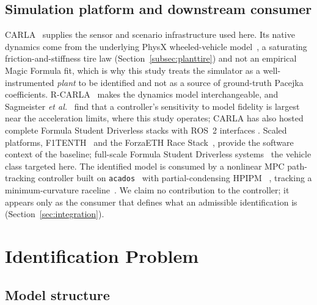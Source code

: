 \documentclass[lineno,12pt]{sn-jnl}
\theoremstyle{thmstyleone}%
\theoremstyle{thmstyletwo}%
\theoremstyle{thmstylethree}%
\begin{document}
\subsection{Simulation platform and downstream consumer}

CARLA~\cite{carla2017} supplies the sensor and scenario infrastructure used
here. Its native dynamics come from the underlying PhysX wheeled-vehicle
model~\cite{physxvehicle}, a saturating friction-and-stiffness tire law
(Section~\ref{subsec:planttire}) and not an empirical Magic Formula fit,
which is why this study treats the simulator as a well-instrumented \emph{plant}
to be identified and not as a source of ground-truth Pacejka coefficients.
R-CARLA~\cite{rcarla2025} makes the dynamics model interchangeable, and
Sagmeister \emph{et al.}~\cite{simfidelity2026} find that a controller's
sensitivity to model fidelity is largest near the acceleration limits, where
this study operates; CARLA has also hosted complete Formula Student Driverless
stacks with ROS~2 interfaces \cite{carlaros2025}. Scaled
platforms, F1TENTH~\cite{f1tenth2020} and the ForzaETH Race
Stack~\cite{forzaeth2024}, provide the software context of the baseline;
full-scale Formula Student Driverless systems~\cite{amz2020} the vehicle class
targeted here. The identified model is consumed by a nonlinear MPC path-tracking
controller built on \texttt{acados}~\cite{acados2022} with partial-condensing
HPIPM~\cite{hpipm2020} \cite{liniger2015,kabzan2019lbmpc}, tracking a
minimum-curvature raceline~\cite{heilmeier2020}. We claim no contribution to the
controller; it appears only as the consumer that defines what an admissible
identification is (Section~\ref{sec:integration}).

\section{Identification Problem}
\label{sec:problem}

\subsection{Model structure}
\label{subsec:model}
\end{document}
